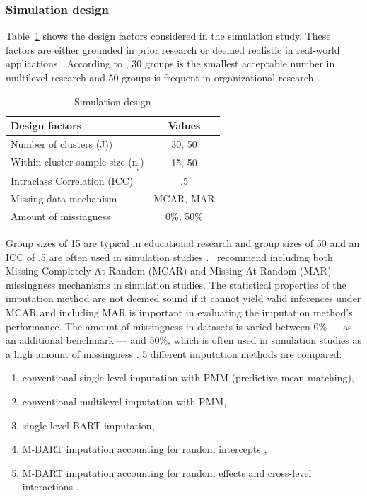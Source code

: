 \documentclass[3p,12pt,a4paper]{elsarticle}
\begin{document}
\subsubsection{Simulation design} \label{sec:simulation}
Table~\ref{tab:simulationparameters} shows the design factors considered in the simulation study. These factors are either grounded in prior research or deemed realistic in real-world applications \citep{gulliford1999, murray2003, hox2017, grund2018, enders2018a, enders2020}. According to \citet{kreft2007}, 30 groups is the smallest acceptable number in multilevel research and 50 groups is frequent in organizational research \citep{maas2005}. 
\begin{table}
    \centering
    \caption{Simulation design}
    \label{tab:simulationparameters}
    \begin{tabular}{l|c}
            \textbf{Design factors}                             & \textbf{Values} \\ \hline
            Number of clusters (J))                             & 30, 50 \\
            Within-cluster sample size (n\textsubscript{j})     & 15, 50 \\
            Intraclass Correlation (ICC)                        & .5 \\
            Missing data mechanism                              & MCAR, MAR \\
            Amount of missingness                               & 0\%, 50\%
    \end{tabular}
\end{table} Group sizes of 15 are typical in educational research \citep{ludtke2017} and group sizes of 50 and an ICC of .5 are often used in simulation studies \citep{maas2005,enders2018,akkayahocagil2023,grund2018,enders2018a,enders2020,salditt2023,mistler2017}.~\citet{oberman2023} recommend including both Missing Completely At Random (MCAR) and Missing At Random (MAR) missingness mechanisms in simulation studies. The statistical properties of the imputation method are not deemed sound if it cannot yield valid inferences under MCAR and including MAR is important in evaluating the imputation method's performance. The amount of missingness in datasets is varied between 0\% --- as an additional benchmark --- and 50\%, which is often used in simulation studies as a high amount of missingness \citep{ludtke2017,grund2016,schouten2021}. 5 different imputation methods are compared: 
\begin{enumerate}
    \item conventional single-level imputation with PMM (predictive mean matching),
    \item conventional multilevel imputation with PMM,
    \item single-level BART imputation,
    \item M-BART imputation accounting for random intercepts \citep{wagner2020, tan2016},
    \item M-BART imputation accounting for random effects and cross-level interactions \citep{dorie2022}.
\end{enumerate} 
\end{document}
